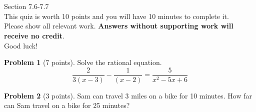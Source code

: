 \documentclass[11pt]{article}
\theoremstyle{definition}
\newtheorem{problem}{Problem}
\begin{document}
\section*{}
Section 7.6-7.7\\
This quiz is worth 10 points and you will have 10 minutes to complete it.\\
Please show all relevant work. \textbf{Answers without supporting work will receive no credit}.\\
Good luck!
\begin{problem}[7 points] Solve the rational equation.
\[\frac{2}{3(x-3)}-\frac{1}{(x-2)}=\frac{5}{x^{2}-5x+6}   \]


\end{problem}


\vspace{2in}

\begin{problem}[3 points] Sam can travel 3 miles on a bike for 10 minutes. How far can Sam travel on a bike for 25 minutes?

\end{problem}
\end{document}
